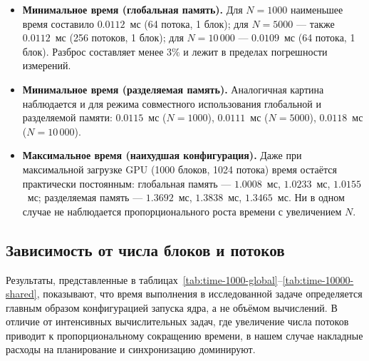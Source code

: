 \documentclass{article}[14pt]
\begin{document}
\begin{itemize}
    \item \textbf{Минимальное время (глобальная память).}  
    Для $N = 1000$ наименьшее время составило $0.0112$~мс (64 потока, 1 блок);  
    для $N = 5000$ --- также $0.0112$~мс (256 потоков, 1 блок);  
    для $N = 10\,000$ --- $0.0109$~мс (64 потока, 1 блок).  
    Разброс составляет менее $3\%$ и лежит в пределах погрешности измерений.

    \item \textbf{Минимальное время (разделяемая память).}  
    Аналогичная картина наблюдается и для режима совместного использования глобальной и разделяемой памяти:  
    $0.0115$~мс ($N=1000$), $0.0111$~мс ($N=5000$), $0.0118$~мс ($N=10\,000$).

    \item \textbf{Максимальное время (наихудшая конфигурация).}  
    Даже при максимальной загрузке GPU (1000 блоков, 1024 потока) время остаётся практически постоянным:  
    глобальная память --- $1.0008$~мс, $1.0233$~мс, $1.0155$~мс;  
    разделяемая память --- $1.3692$~мс, $1.3838$~мс, $1.3465$~мс.  
    Ни в одном случае не наблюдается пропорционального роста времени с увеличением $N$.
\end{itemize}

\subsection*{Зависимость от числа блоков и потоков}

Результаты, представленные в таблицах~\ref{tab:time-1000-global}--\ref{tab:time-10000-shared}, показывают, что время выполнения в исследованной задаче определяется главным образом конфигурацией запуска ядра, а не объёмом вычислений.  
В отличие от интенсивных вычислительных задач, где увеличение числа потоков приводит к пропорциональному сокращению времени, в нашем случае накладные расходы на планирование и синхронизацию доминируют.
\end{document}
